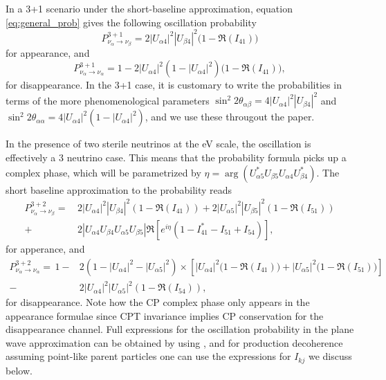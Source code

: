 In a 3+1 scenario under the short-baseline approximation, equation \ref{eq:general_prob} gives the following oscillation probability
%
\begin{equation} \label{eq:app3+1}
P^{3+1}_{\nu_{\alpha} \to \nu_{\beta}} = 2 |U_{\alpha 4}|^2 |U_{\beta 4}|^2 \big(1 -\Re(I_{41}) \big)
\end{equation}
%
for appearance, and
%
\begin{equation} \label{eq:dis3+1}
P^{3+1}_{\nu_{\alpha} \to \nu_{\alpha}} = 1 - 2|U_{\alpha 4}|^2(1 - |U_{\alpha 4}|^2) \big(1 -\Re(I_{41}) \big),
\end{equation}
%
for disappearance. In the 3+1 case, it is customary to write the probabilities in terms of the more phenomenological parameters $\sin^2 {2 \theta_{\alpha \beta}} = 4 |U_{\alpha 4}|^2 |U_{\beta 4}|^2 $ and $\sin^2 {2 \theta_{\alpha \alpha}} = 4 |U_{\alpha 4}|^2(1 - |U_{\alpha 4}|^2) $, and we use these througout the paper.

In the presence of two sterile neutrinos at the eV scale, the oscillation is effectively a 3 neutrino case. This means that the probability formula picks up a complex phase, which will be parametrized by $\eta = \arg{(U_{\alpha 5}^* U_{\beta 5} U_{\alpha 4} U_{\beta 4}^*)}$. The short baseline approximation to the probability reads
%
\begin{align}
P^{3+2}_{\nu_{\alpha} \to \nu_{ \beta}}  =\, &2 \left|U_{\alpha 4}\right|^2 \left|U_{\beta 4}\right|^2 \left(1 - \Re(I_{4 1}) \right) + 2 \left|U_{\alpha 5}\right|^2 \left|U_{\beta 5}\right|^2 (1 - \Re(I_{5 1})) \nonumber \\
+ &2 \left| U_{\alpha 4} U_{\beta 4} U_{\alpha 5} U_{\beta 5}\right|  \Re\left[ e^{i \eta} \left( 1 - I_{41}^* - I_{51} + I_{54} \right) \right],
\end{align}
%
for apperance, and
%
\begin{align}
P^{3+2}_{\nu_{\alpha} \to \nu_{ \alpha}}  =\,1 - &2(1 - |U_{\alpha 4}|^2 - |U_{\alpha 5}|^2) \times \left[ |U_{\alpha 4}|^2 \big(1 - \Re(I_{41}))  + |U_{\alpha 5}|^2 \big( 1 - \Re(I_{51}) \big)\right] \nonumber \\ - &2 |U_{\alpha 4}|^2 |U_{\alpha 5}|^2 \left(1 - \Re(I_{54})\right), 
\end{align}
%
for disappearance. Note how the CP complex phase only appears in the appearance formulae since CPT invariance implies CP conservation for the disappearance channel. Full expressions for the oscillation probability in the plane wave approximation can be obtained by using , and for production decoherence assuming point-like parent particles one can use the expressions for $I_{k j}$ we discuss below.

